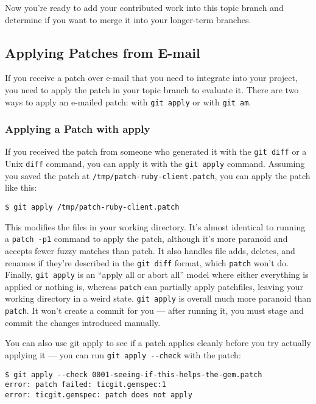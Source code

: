 \documentclass[a4paper]{book}
\begin{document}
Now you're ready to add your contributed work into this topic branch and determine if you want to merge it into your longer-term branches.

\subsection{Applying Patches from E-mail}

If you receive a patch over e-mail that you need to integrate into your project, you need to apply the patch in your topic branch to evaluate it. There are two ways to apply an e-mailed patch: with \texttt{git apply} or with \texttt{git am}.

\subsubsection{Applying a Patch with apply}

If you received the patch from someone who generated it with the \texttt{git diff} or a Unix \texttt{diff} command, you can apply it with the \texttt{git apply} command. Assuming you saved the patch at \texttt{/tmp/patch-ruby-client.patch}, you can apply the patch like this:

\begin{shaded}\begin{verbatim}
$ git apply /tmp/patch-ruby-client.patch
\end{verbatim}\end{shaded}

This modifies the files in your working directory. It's almost identical to running a \texttt{patch -p1} command to apply the patch, although it's more paranoid and accepts fewer fuzzy matches than patch. It also handles file adds, deletes, and renames if they're described in the \texttt{git diff} format, which \texttt{patch} won't do. Finally, \texttt{git apply} is an “apply all or abort all” model where either everything is applied or nothing is, whereas \texttt{patch} can partially apply patchfiles, leaving your working directory in a weird state. \texttt{git apply} is overall much more paranoid than \texttt{patch}. It won't create a commit for you --- after running it, you must stage and commit the changes introduced manually.

You can also use git apply to see if a patch applies cleanly before you try actually applying it --- you can run \texttt{git apply -{}-check} with the patch:

\begin{shaded}\begin{verbatim}
$ git apply --check 0001-seeing-if-this-helps-the-gem.patch
error: patch failed: ticgit.gemspec:1
error: ticgit.gemspec: patch does not apply
\end{verbatim}\end{shaded}
\end{document}
